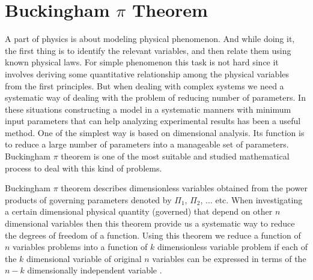 \section{Buckingham $\pi$ Theorem}
\label{sect:buckingham-pi-thm}
A part of physics is about modeling physical phenomenon. And while doing it, the first thing is to identify the relevant variables, and then relate them using known physical laws. For simple phenomenon this task is not hard since it involves deriving some quantitative relationship among the physical variables from the first principles. But when dealing with complex systems we need a systematic way of dealing with the problem of reducing number of parameters. In these situations constructing a model in a systematic manners with minimum input parameters that can help analyzing experimental results has been a useful method. One of the simplest way is based on dimensional analysis. Its function is to reduce a large number of parameters into a manageable set of parameters. Buckingham $\pi$ theorem is one of the most suitable and studied mathematical process to deal with this kind of problems.


Buckingham $\pi$ theorem describes dimensionless variables obtained from the power products of governing parameters denoted by $\Pi_1$, $\Pi_2$, $\ldots$ etc. When investigating a certain dimensional physical quantity (governed) that depend on other $n$ dimensional variables then this theorem provide us a systematic way to reduce the degrees of freedom of a function. Using this theorem we reduce a function of $n$ variables problems into a function of $k$ dimensionless variable problem if each of the $k$ dimensional variable of original $n$ variables can be expressed in terms of the $n-k$ dimensionally independent variable \cite{Buckingham1914}.


